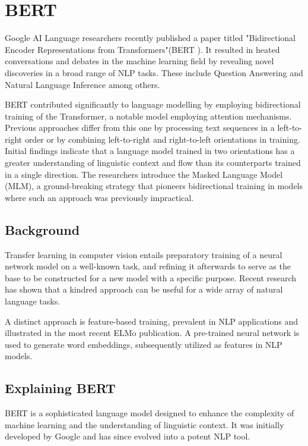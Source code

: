 \section{BERT}

Google AI Language researchers recently published a paper titled "Bidirectional Encoder Representations from Transformers"(BERT \cite{BERT}). It resulted in heated conversations and debates in the machine learning field by revealing novel discoveries in a broad range of NLP tasks. These include Question Answering and Natural Language Inference among others.

BERT contributed significantly to language modelling by employing bidirectional training of the Transformer, a notable model employing attention mechanisms. Previous approaches differ from this one by processing text sequences in a left-to-right order or by combining left-to-right and right-to-left orientations in training. Initial findings indicate that a language model trained in two orientations has a greater understanding of linguistic context and flow than its counterparts trained in a single direction. The researchers introduce the Masked Language Model (MLM), a ground-breaking strategy that pioneers bidirectional training in models where such an approach was previously impractical.





\subsection{Background}

Transfer learning in computer vision entails preparatory training of a neural network model on a well-known task, and refining it afterwards to serve as the base to be constructed for a new model with a specific purpose. Recent research has shown that a kindred approach can be useful for a wide array of natural language tasks.

A distinct approach is feature-based training, prevalent in NLP applications and illustrated in the most recent ELMo publication. A pre-trained neural network is used to generate word embeddings, subsequently utilized as features in NLP models.



\subsection{Explaining BERT}

BERT is a sophisticated language model designed to enhance the complexity of machine learning and the understanding of linguistic context. It was initially developed by Google and has since evolved into a potent NLP tool.

